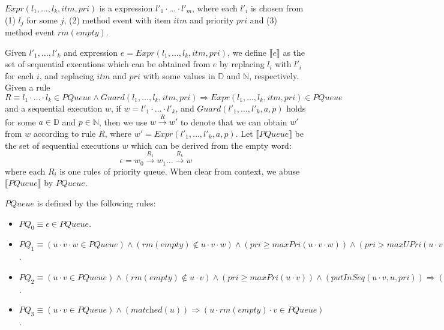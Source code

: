 $\textit{Expr}(l_1,\ldots,l_k,\textit{itm},\textit{pri})$ is a expression $l'_1 \cdot \ldots \cdot l'_m$, where each $l'_i$ is chosen from (1) $l_j$ for some $j$, (2) method event with item $\textit{itm}$ and priority $\textit{pri}$ and (3) method event $\textit{rm}(\textit{empty})$.

Given $l'_1,\ldots,l'_k$ and expression $e=\textit{Expr}(l_1,\ldots,l_k,\textit{itm},\textit{pri})$, we define $\llbracket e \rrbracket$ as the set of sequential executions which can be obtained from $e$ by replacing $l_i$ with $l'_i$ for each $i$, and replacing $\textit{itm}$ and $\textit{pri}$ with some values in $\mathbb{D}$ and $\mathbb{N}$, respectively. Given a rule $R \equiv l_1 \cdot \ldots \cdot l_k \in \textit{PQueue} \wedge \textit{Guard}(l_1,\ldots,l_k,\textit{itm},\textit{pri}) \Rightarrow \textit{Expr}(l_1,\ldots,l_k,\textit{itm},\textit{pri}) \in \textit{PQueue}$ and a sequential execution $w$, if $w=l'_1 \cdot \ldots \cdot l'_k$, and $\textit{Guard}(l'_1,\ldots,l'_k,a,p)$ holds for some $a \in \mathbb{D}$ and $p \in \mathbb{N}$, then we use $w \xrightarrow{R} w'$ to denote that we can obtain $w'$ from $w$ according to rule $R$, where $w' = \textit{Expr}(l'_1,\ldots,l'_k,a,p)$. Let $\llbracket \textit{PQueue} \rrbracket$ be the set of sequential executions $w$ which can be derived from the empty word: $$\epsilon = w_0 \xrightarrow{R_1} w_1 \ldots \xrightarrow{R_k} w$$ where each $R_i$ is one rules of priority queue. When clear from context, we abuse $\llbracket \textit{PQueue} \rrbracket$ by $\textit{PQueue}$.

\begin{definition}\label{def:inductive rules of priority queue}
$\textit{PQueue}$ is defined by the following rules:
\begin{itemize}
\setlength{\itemsep}{0.5pt}
\item[-] $\textit{PQ}_0 \equiv \epsilon \in \textit{PQueue}$.

\item[-] $\textit{PQ}_1 \equiv (u \cdot v \cdot w \in \textit{PQueue}) \wedge (\textit{rm}(\textit{empty}) \notin u \cdot v \cdot w) \wedge (\textit{pri} \geq \textit{maxPri}(u \cdot v \cdot w)) \wedge (\textit{pri} > \textit{maxUPri}(u \cdot v \cdot w)) \wedge (\textit{matched}(u \cdot v) ) \wedge (\textit{putInSeq}(u \cdot v \cdot w,u,\textit{pri})) \Rightarrow (u \cdot \textit{put}(\textit{itm},\textit{pri}) \cdot v \cdot \textit{rm}(\textit{itm}) \cdot w \in \textit{PQueue})$.

\item[-] $\textit{PQ}_2 \equiv (u \cdot v \in \textit{PQueue}) \wedge (\textit{rm}(\textit{empty}) \notin u \cdot v) \wedge (\textit{pri} \geq \textit{maxPri}(u \cdot v)) \wedge (\textit{putInSeq}(u \cdot v,u,\textit{pri})) \Rightarrow (u \cdot \textit{put}(\textit{itm},\textit{pri}) \cdot v \in \textit{PQueue})$.

\item[-] $\textit{PQ}_3 \equiv (u \cdot v \in \textit{PQueue}) \wedge (\textit{matched}(u) ) \Rightarrow (u \cdot \textit{rm}(\textit{empty}) \cdot v \in \textit{PQueue})$.
\end{itemize}
\end{definition}

